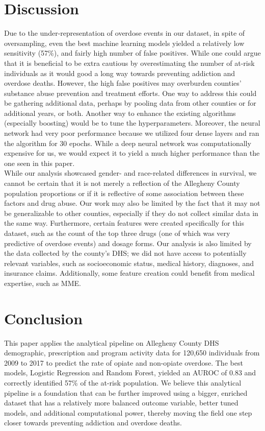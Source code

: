 \documentclass[twoside,10.5pt]{article}
\begin{document}
\section{Discussion}
Due to the under-representation of overdose events in our dataset, in spite of oversampling, even the best machine learning models yielded a relatively low sensitivity (57\%), and fairly high number of false positives. While one could argue that it is beneficial to be extra cautious by overestimating the number of at-risk individuals as it would good a long way towards preventing addiction and overdose deaths. However, the high false positives may overburden counties' substance abuse prevention and treatment efforts. One way to address this could be gathering additional data, perhaps by pooling data from other counties or for additional years, or both. Another way to enhance the existing algorithms (especially boosting) would be to tune the hyperparameters. Moreover, the neural network had very poor performance because we utilized four dense layers and ran the algorithm for 30 epochs. While a deep neural network was computationally expensive for us, we would expect it to yield a much higher performance than the one seen in this paper. \\

While our analysis showcased gender- and race-related differences in survival, we cannot be certain that it is not merely a reflection of the Allegheny County population proportions or if it is reflective of some association between these factors and drug abuse. Our work may also be limited by the fact that it may not be generalizable to other counties, especially if they do not collect similar data in the same way. Furthermore, certain features were created specifically for this dataset, such as the count of the top three drugs (one of which was very predictive of overdose events) and dosage forms. Our analysis is also limited by the data collected by the county's DHS; we did not have access to potentially relevant variables, such as socioeconomic status, medical history, diagnoses, and insurance claims. Additionally, some feature creation could benefit from medical expertise, such as MME. 

\section{Conclusion}
This paper applies the analytical pipeline on Allegheny County DHS demographic, prescription and program activity data for 120,650 individuals from 2009 to 2017 to predict the rate of opiate and non-opiate overdose. The best models, Logistic Regression and Random Forest, yielded an AUROC of 0.83 and correctly identified 57\% of the at-risk population. We believe this analytical pipeline is a foundation that can be further improved using a bigger, enriched dataset that has a relatively more balanced outcome variable, better tuned models, and additional computational power, thereby moving the field one step closer towards preventing addiction and overdose deaths.
\end{document}
